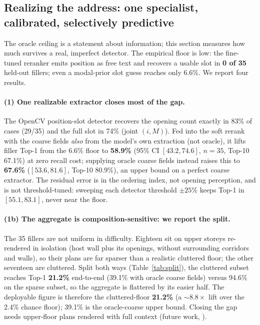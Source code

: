 \subsection{Realizing the address: one specialist, calibrated, selectively predictive}
\label{sec:eval-realized}

The oracle ceiling is a statement about information; this section measures how much survives a real,
imperfect detector. The empirical floor is low: the fine-tuned reranker emits position as free text and
recovers a usable slot in \textbf{0 of 35} held-out fillers; even a modal-prior slot guess reaches
only 6.6\%. We report four results.

\paragraph{(1) One realizable extractor closes most of the gap.} The OpenCV position-slot detector
recovers the opening count exactly in 83\% of cases (29/35) and the full slot in 74\% (joint $(i,M)$).
Fed into the soft rerank with the coarse fields \emph{also} from the model's own extraction (not
oracle), it lifts filler Top-1 from the 6.6\% floor to \textbf{58.9\%} (95\% CI $[43.2, 74.6]$, $n=35$,
Top-10 67.1\%) at zero recall cost; supplying oracle coarse fields instead raises this to
\textbf{67.6\%} ($[53.6, 81.6]$, Top-10 80.9\%), an upper bound on a perfect coarse extractor. The
residual error is in the ordering index, not opening perception, and is not threshold-tuned: sweeping
each detector threshold $\pm25\%$ keeps Top-1 in $[55.1, 83.1]$, never near the floor.

\paragraph{(1b) The aggregate is composition-sensitive: we report the split.} The 35 fillers are not
uniform in difficulty. Eighteen sit on upper storeys re-rendered in isolation (host wall plus its
openings, without surrounding corridors and walls), so their plans are far sparser than a realistic
cluttered floor; the other seventeen are cluttered. Split both ways (Table~\ref{tab:split}), the
cluttered subset reaches Top-1 \textbf{21.2\%} end-to-end (39.1\% with oracle coarse fields) versus
94.6\% on the sparse subset, so the aggregate is flattered by its easier half. The deployable figure is
therefore the cluttered-floor \textbf{21.2\%} (a ${\sim}8.8\times$ lift over the 2.4\% chance floor);
39.1\% is the oracle-coarse upper bound. Closing the gap needs upper-floor plans rendered with full
context (future work, ).

